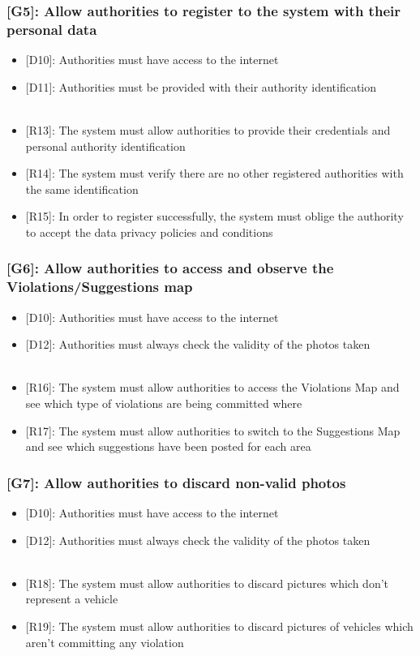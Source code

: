 \documentclass[12pt,a4paper]{article}
\begin{document}
\subsubsection*{{[}{G5}{]}: Allow authorities to register to the system with their personal data}
\begin{itemize}
\item {[D10]}: Authorities must have access to the internet
\item {[D11]}: Authorities must be provided with their authority identification
\\\\
\item {[R13]}: The system must allow authorities to provide their credentials and personal authority identification
\item {[R14]}: The system must verify there are no other registered authorities with the same identification
\item {[R15]}: In order to register successfully, the system must oblige the authority to accept the data privacy policies and conditions
\end{itemize}
\subsubsection*{{[}{G6}{]}: Allow authorities to access and observe the Violations/Suggestions map}
\begin{itemize}
\item {[D10]}: Authorities must have access to the internet
\item {[D12]}: Authorities must always check the validity of the photos taken
\\\\
\item {[R16]}: The system must allow authorities to access the Violations Map and see which type of violations are being committed where
\item {[R17]}: The system must allow authorities to switch to the Suggestions Map and see which suggestions have been posted for each area
\end{itemize}
\subsubsection*{{[}{G7}{]}: Allow authorities to discard non-valid photos}
\begin{itemize}
\item {[D10]}: Authorities must have access to the internet
\item {[D12]}: Authorities must always check the validity of the photos taken
\\\\
\item {[R18]}: The system must allow authorities to discard pictures which don't represent a vehicle
\item {[R19]}: The system must allow authorities to discard pictures of vehicles which aren't committing any violation
\end{itemize}
\newpage
\end{document}
